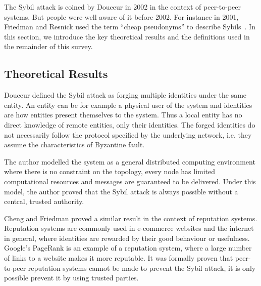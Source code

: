 The Sybil attack is coined by Douceur\cite{douceur2002sybil} in 2002 in the
context of peer-to-peer systems. But people were well aware of it before 2002.
For instance in 2001, Friedman and Resnick used the term ``cheap pseudonyms'' to
describe Sybils~\cite{resnick2001social}. In this section, we introduce the key
theoretical results and the definitions used in the remainder of this survey.

\subsection{Theoretical Results}\label{sec:sybil-theory}
Douceur defined the Sybil attack as forging multiple identities under the same
entity\cite{douceur2002sybil}. An entity can be for example a physical user of
the system and identities are how entities present themselves to the system.
Thus a local entity has no direct knowledge of remote entities, only their
identities. The forged identities do not necessarily follow the protocol
specified by the underlying network, i.e. they assume the characteristics of
Byzantine fault\cite{lamport1982byzantine}.

The author modelled the system as a general distributed computing environment
where there is no constraint on the topology, every node has limited
computational resources and messages are guaranteed to be delivered. Under this
model, the author proved that the Sybil attack is always possible without a
central, trusted authority.


Cheng and Friedman proved a similar result in the context of reputation
systems\cite{cheng2005sybilproof}. Reputation systems are commonly used in
e-commerce websites and the internet in general, where identities are rewarded
by their good behaviour or usefulness. Google's PageRank\cite{page1999pagerank}
is an example of a reputation system, where a large number of links to a website
makes it more reputable. It was formally proven that peer-to-peer reputation
systems cannot be made to prevent the Sybil attack, it is only possible prevent
it by using trusted parties.


